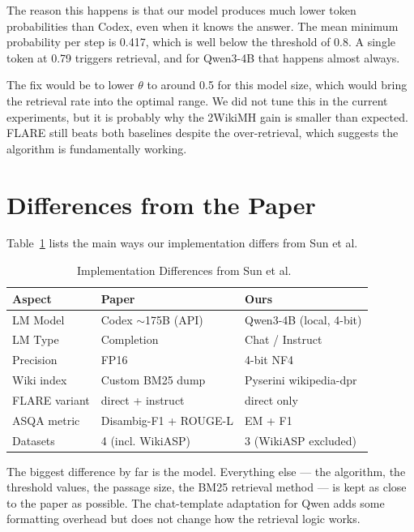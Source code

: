 \documentclass[conference]{IEEEtran}
\begin{document}
The reason this happens is that our model produces much lower token
probabilities than Codex, even when it knows the answer. The mean
minimum probability per step is 0.417, which is well below the
threshold of 0.8. A single token at 0.79 triggers retrieval, and
for Qwen3-4B that happens almost always.

The fix would be to lower $\theta$ to around 0.5 for this model
size, which would bring the retrieval rate into the optimal range.
We did not tune this in the current experiments, but it is probably
why the 2WikiMH gain is smaller than expected. FLARE still beats
both baselines despite the over-retrieval, which suggests the
algorithm is fundamentally working.

\section{Differences from the Paper}
\label{sec:differences}

Table~\ref{tab:differences} lists the main ways our implementation
differs from Sun et al.

\begin{table}[htbp]
\caption{Implementation Differences from Sun et al.~\cite{sun2023flare}}
\label{tab:differences}
\centering
\begin{tabular}{p{1.5cm}p{2.2cm}p{2.2cm}}
\toprule
\textbf{Aspect}       & \textbf{Paper}              & \textbf{Ours}               \\
\midrule
LM Model      & Codex $\sim$175B (API)      & Qwen3-4B (local, 4-bit)     \\
LM Type       & Completion                  & Chat / Instruct             \\
Precision     & FP16                        & 4-bit NF4                   \\
Wiki index    & Custom BM25 dump            & Pyserini wikipedia-dpr      \\
FLARE variant & direct + instruct           & direct only                 \\
ASQA metric   & Disambig-F1 + ROUGE-L       & EM + F1                     \\
Datasets      & 4 (incl. WikiASP)           & 3 (WikiASP excluded)        \\
\bottomrule
\end{tabular}
\end{table}

The biggest difference by far is the model. Everything else —
the algorithm, the threshold values, the passage size, the
BM25 retrieval method — is kept as close to the paper as possible.
The chat-template adaptation for Qwen adds some formatting overhead
but does not change how the retrieval logic works.
\end{document}
